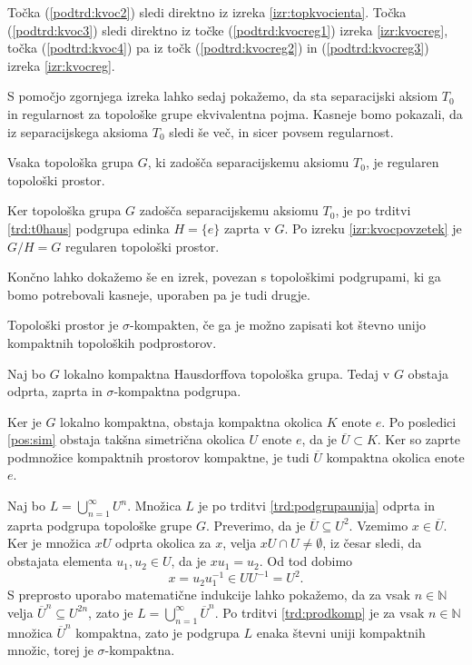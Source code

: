 \documentclass[mat1]{fmfdelo}
\newcommand{\N}{\mathbb N}
\newcommand{\closure}[1]{\overline{#1}}
\begin{document}
\begin{dokaz}
Točka (\ref{podtrd:kvoc2}) sledi direktno iz izreka \ref{izr:topkvocienta}.
Točka (\ref{podtrd:kvoc3}) sledi direktno iz točke (\ref{podtrd:kvocreg1}) izreka \ref{izr:kvocreg}, točka (\ref{podtrd:kvoc4}) pa iz točk (\ref{podtrd:kvocreg2}) in (\ref{podtrd:kvocreg3}) izreka \ref{izr:kvocreg}.
\end{dokaz}

S pomočjo zgornjega izreka lahko sedaj pokažemo, da sta separacijski aksiom $T_0$ in regularnost za topološke grupe ekvivalentna pojma. Kasneje bomo pokazali, da iz separacijskega aksioma $T_0$ sledi še več, in sicer povsem regularnost.

\begin{posledica}\label{izr:t3}
	Vsaka topološka grupa $G$, ki zadošča separacijskemu aksiomu $T_0$, je regularen topološki prostor.
\end{posledica}

\begin{dokaz}
Ker topološka grupa $G$ zadošča separacijskemu aksiomu $T_0$, je po trditvi \ref{trd:t0haus} podgrupa edinka $H = \lbrace e \rbrace$ zaprta v $G$. Po izreku \ref{izr:kvocpovzetek} je $G/H = G$ regularen topološki prostor.
\end{dokaz}

Končno lahko dokažemo še en izrek, povezan s topološkimi podgrupami, ki ga bomo potrebovali kasneje, uporaben pa je tudi drugje.

\begin{definicija}
	Topološki prostor je $\sigma$-kompakten, če ga je možno zapisati kot števno unijo kompaktnih topoloških podprostorov.
\end{definicija}

\begin{izrek}\label{izr:odpzapsigma}
	Naj bo $G$ lokalno kompaktna Hausdorffova topološka grupa. Tedaj v $G$ obstaja odprta, zaprta in $\sigma$-kompaktna podgrupa.
\end{izrek}

\begin{dokaz}
	Ker je $G$ lokalno kompaktna, obstaja kompaktna okolica $K$ enote $e$. Po posledici \ref{pos:sim} obstaja takšna simetrična okolica $U$ enote $e$, da je $\closure{U} \subset K$. Ker so zaprte podmnožice kompaktnih prostorov kompaktne, je tudi $\closure{U}$ kompaktna okolica enote $e$.
	
	Naj bo $L = \bigcup_{n=1}^\infty U^n$. Množica $L$ je po trditvi \ref{trd:podgrupaunija} odprta in zaprta podgrupa topološke grupe $G$.
	Preverimo, da je $\closure{U} \subseteq U^2$. Vzemimo $x \in \closure{U}$. Ker je množica $xU$ odprta okolica za $x$, velja $xU \cap U \neq \emptyset$, iz česar sledi, da obstajata elementa $u_1,u_2 \in U$, da je $xu_1 = u_2$. Od tod dobimo
	\[ x = u_2u_1^{-1} \in UU^{-1} = U^2. \]
	S preprosto uporabo matematične indukcije lahko pokažemo, da za vsak $n \in \N$ velja $\closure{U}^n \subseteq U^{2n}$, zato je $L = \bigcup_{n=1}^\infty \closure{U}^n$. Po trditvi \ref{trd:prodkomp} je za vsak $n \in \N$ množica $\closure{U}^n$ kompaktna, zato je podgrupa $L$ enaka števni uniji kompaktnih množic, torej je $\sigma$-kompaktna.
\end{dokaz}
\end{document}
